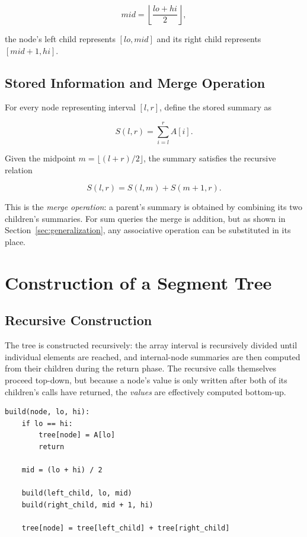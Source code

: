 \documentclass[11pt]{scrartcl}
\begin{document}
\begin{equation}
mid = \left\lfloor \frac{lo+hi}{2} \right\rfloor,
\end{equation}

the node's left child represents $[lo, mid]$ and its right child represents $[mid+1, hi]$.

\subsection{Stored Information and Merge Operation}
For every node representing interval $[l,r]$, define the stored summary as

\begin{equation}
S(l,r) = \sum_{i=l}^{r} A[i].
\end{equation}

Given the midpoint $m = \lfloor (l+r)/2 \rfloor$, the summary satisfies the recursive relation

\begin{equation}
S(l,r) = S(l,m) + S(m+1,r).
\label{eq:merge}
\end{equation}

This is the \emph{merge operation}: a parent's summary is obtained by combining its two children's summaries. For sum queries the merge is addition, but as shown in Section~\ref{sec:generalization}, any associative operation can be substituted in its place.

\section{Construction of a Segment Tree}

\subsection{Recursive Construction}
The tree is constructed recursively: the array interval is recursively divided until individual elements are reached, and internal-node summaries are then computed from their children during the return phase. The recursive calls themselves proceed top-down, but because a node's value is only written after both of its children's calls have returned, the \emph{values} are effectively computed bottom-up.

\begin{lstlisting}
build(node, lo, hi):
    if lo == hi:
        tree[node] = A[lo]
        return

    mid = (lo + hi) / 2

    build(left_child, lo, mid)
    build(right_child, mid + 1, hi)

    tree[node] = tree[left_child] + tree[right_child]
\end{lstlisting}
\end{document}
